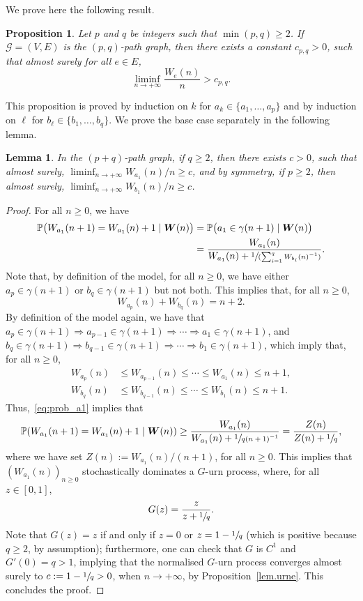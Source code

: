 \documentclass[10pt]{amsart}
\let\mathcal\mathscr
\let \nicefrac\sfrac
\newcommand{\spfrac}[2]{\sfrac{#1}{(#2)}}
\newcommand{\bW}{\boldsymbol{W}}
\numberwithin{equation}{section}
\newtheorem{lemma}[theorem]{Lemma}
\newtheorem{proposition}[theorem]{Proposition}
\theoremstyle{definition}
\begin{document}
\label{subsec.2paths.1}
We prove here the following result.

\begin{proposition}\label{prop:multiedges}
Let $p$ and $q$ be integers such that $\min(p, q)\geq 2$.
If $\mathcal G = (V,E)$ is the $(p,q)$-path graph, then there exists a constant $c_{p,q}>0$, such that almost surely for all $e\in E$,
\[
\liminf_{n\to +\infty} \frac{W_e(n)}n> c_{p,q}.
\]
\end{proposition}
This proposition is proved by induction on $k$ for $a_k\in \{a_1, \ldots, a_p\}$ and by induction on $\ell$ for $b_\ell\in \{b_1, \ldots, b_q\}$. We prove the base case separately in the following lemma.
\begin{lemma}\label{lem:liminf_a1}
In the $(p+q)$-path graph, if $q\geq 2$, then there exists $c>0$, such that almost surely, $\liminf_{n\to+\infty} W_{a_1}(n)/n\ge c$, and by symmetry, if $p\geq 2$, then almost surely, $\liminf_{n\to+\infty} W_{b_1}(n)/n\ge c$.
\end{lemma}

\begin{proof}
For all $n\geq 0$, we have
\begin{equation}
\begin{aligned}\label{eq:prob_a1}
\mathbb P\bigl(W_{a_1}(n+1) = W_{a_1}(n)+1 \mid \bW(n)\bigr)
&=\mathbb P\bigl(a_1 \in \gamma(n+1)\mid \bW(n)\bigr)\\
&= \frac{W_{a_1}(n)}{W_{a_1}(n)+
\spfrac{1}{\sum_{i=1}^q W_{b_i}(n)^{-1}}}.
\end{aligned}
\end{equation}
Note that, by definition of the model,
for all $n\geq 0$,
we have either $a_p\in\gamma(n+1)$ or $b_q\in\gamma(n+1)$ but not both.
This implies that, for all $n\geq 0$,
\[
W_{a_p}(n)+W_{b_q}(n)=n+2.
\]
By definition of the model again,
we have that $a_p\in\gamma(n+1)\Rightarrow a_{p-1}\in \gamma(n+1) \Rightarrow \cdots \Rightarrow a_1\in\gamma(n+1)$, and
$b_q\in\gamma(n+1)\Rightarrow b_{q-1}\in\gamma(n+1)\Rightarrow \cdots \Rightarrow b_1\in\gamma(n+1)$, which imply that, for all $n\geq 0$,
\begin{align*}
W_{a_p}(n)&\leq W_{a_{p-1}}(n)\leq \cdots \leq W_{a_1}(n)\leq n+1,\\
\tag*{and}
W_{b_q}(n)&\leq W_{b_{q-1}}(n)\leq\cdots \leq W_{b_1}(n)\leq n+1.
\end{align*}
Thus,~\eqref{eq:prob_a1} implies that
\[
\mathbb P(W_{a_1}(n+1) = W_{a_1}(n)+1 \mid \bW(n))
\geq \frac{W_{a_1}(n)}{W_{a_1}(n)+\sfrac{1}{q(n+1)^{-1}}}
=\frac{Z(n)}{Z(n)+\nicefrac 1q},
\]
where we have set $Z(n):=W_{a_1}(n)/(n+1)$, for all $n\geq 0$.
This implies that $(W_{a_1}(n))_{n\ge 0}$ stochastically dominates a $G$-urn process,
where, for all $z\in[0,1]$,
\[
G(z) = \frac{z}{z+\nicefrac1{q}}.
\]
Note that $G(z) = z$ if and only if $z=0$ or $z=1-{\nicefrac1q}$
(which is positive because $q\geq 2$, by assumption);
furthermore, one can check that $G$ is $C^1$ and $G'(0) = q > 1$,
implying that the normalised $G$-urn process converges almost surely to $c:= 1-\nicefrac1q>0$, when $n\to+\infty$, by Proposition~\ref{lem.urne}.
This concludes the proof.
\end{proof}
\end{document}
